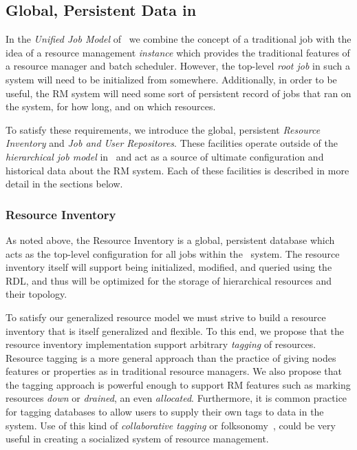 \subsection{Global, Persistent Data in \ngrm}

In the \emph{Unified Job Model} of \ngrm\ we combine the concept
of a traditional job with the idea of a resource management
\emph{instance} which provides the traditional features of a
resource manager and batch scheduler. However, the top-level
\emph{root job} in such a system will need to be initialized from
somewhere. Additionally, in order to be useful, the RM system will
need some sort of persistent record of jobs that ran on the system,
for how long, and on which resources.

To satisfy these requirements, we introduce the global, persistent
\emph{Resource Inventory} and \emph{Job and User Repositores}. These
facilities operate outside of the \emph{hierarchical job model} in
\ngrm\ and act as a source of ultimate configuration and historical
data about the RM system. Each of these facilities is described
in more detail in the sections below.

\subsubsection{Resource Inventory}

As noted above, the Resource Inventory is a global, persistent
database which acts as the top-level configuration for all
jobs within the \ngrm\ system. The resource inventory itself
will support being initialized, modified, and queried using
the RDL, and thus will be optimized for the storage of hierarchical
resources and their topology.
\ifcomments
{}
\fi

To satisfy our generalized resource model we must strive to build
a resource inventory that is itself generalized and flexible.
To this end, we propose that the resource inventory implementation
support arbitrary \emph{tagging} of resources. Resource tagging
is a more general approach than the practice of giving nodes
features or properties as in traditional resource managers. We also
propose that the tagging approach is powerful enough to support RM
features such as marking resources \emph{down} or \emph{drained},
an even \emph{allocated}. Furthermore, it is common practice for
tagging databases to allow users to supply their own tags to data
in the system. Use of this kind of \emph{collaborative tagging}
or folksonomy~\cite{wiki:folksonomy}, could be very useful in
creating a socialized system of resource management.

